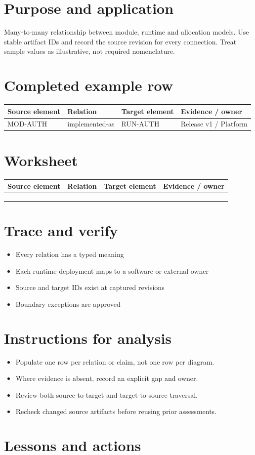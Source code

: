 \documentclass[10pt,letterpaper]{article}
\begin{document}
\DocProvenance
\section{Purpose and application}
Many-to-many relationship between module, runtime and allocation models. Use stable artifact IDs and record the source revision for every connection. Treat sample values as illustrative, not required nomenclature.

\section{Completed example row}
\small
\begin{tabularx}{\linewidth}{@{}YYYY@{}}
\toprule
\textbf{Source element} & \textbf{Relation} & \textbf{Target element} & \textbf{Evidence / owner} \\
\midrule
MOD-AUTH & implemented-as & RUN-AUTH & Release v1 / Platform \\
\bottomrule
\end{tabularx}
\normalsize
\section{Worksheet}
\small
\begin{tabularx}{\linewidth}{@{}YYYY@{}}
\toprule
\textbf{Source element} & \textbf{Relation} & \textbf{Target element} & \textbf{Evidence / owner} \\
\midrule
 &  &  &  \\
 &  &  &  \\
 &  &  &  \\
\bottomrule
\end{tabularx}
\normalsize
\section{Trace and verify}
\begin{itemize}
\item Every relation has a typed meaning
\item Each runtime deployment maps to a software or external owner
\item Source and target IDs exist at captured revisions
\item Boundary exceptions are approved
\end{itemize}
\section{Instructions for analysis}
\begin{itemize}
\item Populate one row per relation or claim, not one row per diagram.
\item Where evidence is absent, record an explicit gap and owner.
\item Review both source-to-target and target-to-source traversal.
\item Recheck changed source artifacts before reusing prior assessments.
\end{itemize}
\section{Lessons and actions}
\end{document}
